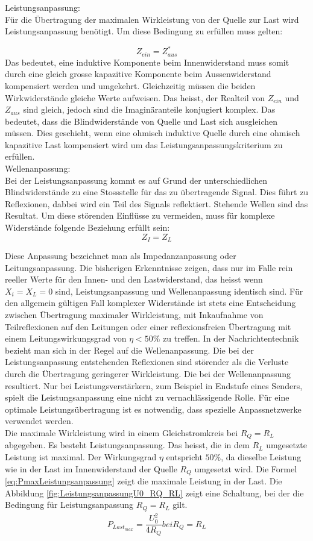 Leistungsanpassung: \\
Für die Übertragung der maximalen Wirkleistung von der Quelle zur Last  wird Leistungsanpassung benötigt. Um diese Bedingung zu erfüllen muss gelten:

\[Z_{ein} = Z_{aus}^*\]
Das bedeutet, eine induktive Komponente beim Innenwiderstand muss somit durch eine gleich grosse kapazitive Komponente beim Aussenwiderstand kompensiert werden und umgekehrt. Gleichzeitig müssen die beiden Wirkwiderstände gleiche Werte aufweisen. Das heisst, der Realteil von $Z_{ein}$ und $Z_{aus}$ sind gleich, jedoch sind die Imaginäranteile konjugiert komplex. Das bedeutet, dass die Blindwiderstände von Quelle und Last sich ausgleichen müssen. Dies geschieht, wenn eine ohmisch induktive Quelle durch eine ohmisch kapazitive Last kompensiert wird um das Leistungsanpassungskriterium zu erfüllen. \\

Wellenanpassung: \\
Bei der Leistungsanpassung kommt es auf Grund der unterschiedlichen Blindwiderstände zu eine Stossstelle für das zu übertragende Signal. Dies führt zu Reflexionen, dabbei wird  ein Teil des Signals reflektiert. Stehende Wellen sind das Resultat. Um diese störenden Einflüsse zu vermeiden, muss für komplexe Widerstände folgende Beziehung erfüllt sein:
\[Z_{I} = Z_{L}\]

Diese Anpassung bezeichnet man als Impedanzanpassung oder Leitungsanpassung. Die bisherigen Erkenntnisse zeigen, dass nur im Falle rein reeller Werte für den Innen- und den  Lastwiderstand, das heisst wenn $X_i = X_L = 0$ sind, Leistungsanpassung und Wellenanpassung identisch sind. Für den allgemein gültigen Fall komplexer Widerstände ist stets eine Entscheidung zwischen Übertragung maximaler Wirkleistung,  mit Inkaufnahme von Teilreflexionen auf den Leitungen oder einer reflexionsfreien Übertragung mit einem Leitungswirkungsgrad von $\eta <50 \%$ zu treffen. In der Nachrichtentechnik bezieht man sich in der Regel auf die Wellenanpassung. Die bei der Leistungsanpassung entstehenden Reflexionen  sind störender als die Verluste durch die Übertragung geringerer Wirkleistung. Die bei der Wellenanpassung resultiert. Nur bei Leistungsverstärkern, zum Beispiel in Endstufe eines Senders, spielt die Leistungsanpassung eine nicht zu vernachlässigende Rolle. Für eine optimale Leistungsübertragung ist es notwendig, dass spezielle Anpassnetzwerke verwendet werden. \\

Die maximale Wirkleistung wird in einem Gleichstromkreis bei $R_Q = R_L$ abgegeben. Es besteht Leistungsanpassung. Das heisst, die in dem $R_L$ umgesetzte Leistung ist maximal. Der Wirkungsgrad $\eta$ entspricht $50\%$, da dieselbe Leistung wie in der Last im Innenwiderstand der Quelle $R_Q$ umgesetzt wird. Die Formel \ref{eq:PmaxLeistungsanpassung} zeigt die maximale Leistung in der Last. Die Abbildung \ref{fig:LeistungsanpassungU0_RQ_RL} zeigt eine Schaltung, bei der die Bedingung für Leistungsanpassung $R_Q = R_L$ gilt.
\begin{eqnarray}\label{eq:PmaxLeistungsanpassung}
P_{Last_{max}}=\dfrac{U_{0}^2}{4R_Q} bei R_Q=R_L
\end{eqnarray}

